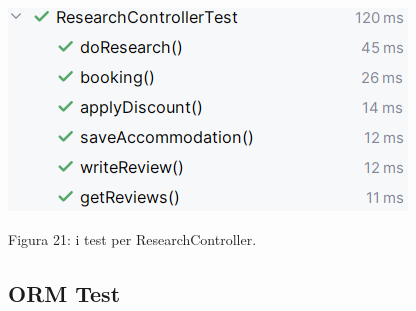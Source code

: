 \documentclass[10pt]{article}
\begin{document}
\begin{center}
\includegraphics[scale=0.55]{test/BusinessLogic/testResearchController}
\par\medskip
Figura 21: i test per ResearchController.
\par\medskip
\end{center}

\subsection{ORM Test}
\end{document}

